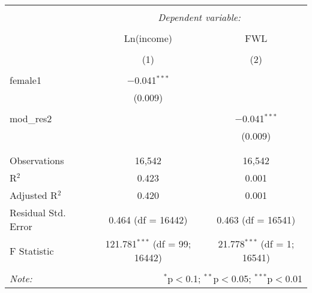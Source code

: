 
\begin{table}[!htbp] \centering 
  \caption{} 
  \label{} 
\begin{tabular}{@{\extracolsep{5pt}}lcc} 
\\[-1.8ex]\hline 
\hline \\[-1.8ex] 
 & \multicolumn{2}{c}{\textit{Dependent variable:}} \\ 
\cline{2-3} 
\\[-1.8ex] & Ln(income) & FWL \\ 
\\[-1.8ex] & (1) & (2)\\ 
\hline \\[-1.8ex] 
 female1 & $-$0.041$^{***}$ &  \\ 
  & (0.009) &  \\ 
  & & \\ 
 mod\_res2 &  & $-$0.041$^{***}$ \\ 
  &  & (0.009) \\ 
  & & \\ 
\hline \\[-1.8ex] 
Observations & 16,542 & 16,542 \\ 
R$^{2}$ & 0.423 & 0.001 \\ 
Adjusted R$^{2}$ & 0.420 & 0.001 \\ 
Residual Std. Error & 0.464 (df = 16442) & 0.463 (df = 16541) \\ 
F Statistic & 121.781$^{***}$ (df = 99; 16442) & 21.778$^{***}$ (df = 1; 16541) \\ 
\hline 
\hline \\[-1.8ex] 
\textit{Note:}  & \multicolumn{2}{r}{$^{*}$p$<$0.1; $^{**}$p$<$0.05; $^{***}$p$<$0.01} \\ 
\end{tabular} 
\end{table} 
